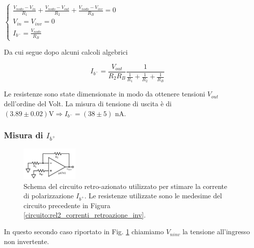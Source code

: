 $\begin{cases} \frac{V_{nodo} - V_{in}}{R_1} + \frac{V_{nodo}-V_{out}}{R_2} + \frac{V_{nodo}-V_{inv}}{R_B}=0 \\ V_{in}=V_{inv}=0  \\I_{b^-} = \frac{V_{nodo}}{R_B} \end{cases} $

Da cui segue dopo alcuni calcoli algebrici



$$I_{b^-}=\frac{V_{out}}{R_2 R_B}\frac{1}{\frac{1}{R_1}+\frac{1}{R_2}+\frac{1}{R_B}}$$

Le resistenze sono state dimensionate in modo da ottenere tensioni $V_{out}$ dell'ordine del Volt.
La misura di tensione di uscita è di $(3.89\pm0.02)\si{\volt} \Rightarrow I_{b^-} = (38 \pm 5)$ \si{\nano\ampere}.

\subsubsection*{Misura di $I_{b^+}$}

\begin{figure}
  \begin{center}
    \includegraphics[width=0.25\textwidth]{../E02/latex/ninv_current.pdf}
  \end{center}
  \caption{Schema del circuito retro-azionato utilizzato per stimare la corrente di polarizzazione $I_{b^+}$. Le resistenze utilizzate sono le medesime del circuito precedente in Figura \ref{circuito:rel2_correnti_retroazione_inv}.}
  \label{circuito:rel2_correnti_retroazione_noninv}
\end{figure}


In questo secondo caso riportato in Fig. \ref{circuito:rel2_correnti_retroazione_noninv} chiamiamo $V_{ninv}$ la tensione all'ingresso non invertente.


